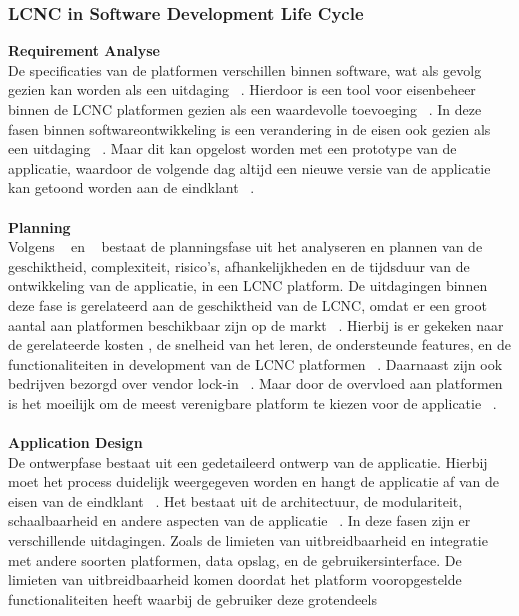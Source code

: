 \subsubsection*{LCNC in Software Development Life Cycle}
\label{subsec:lcnc-binnen-agile}
\textbf{Requirement Analyse}
\\
De specificaties van de platformen verschillen binnen software, wat als gevolg gezien kan worden als een uitdaging ~\autocite{Rokis_2022}. 
Hierdoor is een tool voor eisenbeheer binnen de LCNC platformen gezien als een waardevolle toevoeging ~\autocite{Rokis_2022}. 
In deze fasen binnen softwareontwikkeling is een verandering in de eisen ook gezien als een uitdaging ~\autocite{Rokis_2022}. 
Maar dit kan opgelost worden met een prototype van de applicatie, 
waardoor de volgende dag altijd een nieuwe versie van de applicatie kan getoond worden aan de eindklant ~\autocite{Rokis_2022}.
\\
\\
\textbf{Planning}
\\
Volgens ~\textcite{Rokis_2022} en ~\textcite{Ghumatkar_2023}  bestaat de planningsfase uit het analyseren en plannen van de geschiktheid, complexiteit, risico's, afhankelijkheden en 
de tijdsduur van de ontwikkeling van de applicatie, in een LCNC platform. De uitdagingen binnen deze fase is gerelateerd aan de geschiktheid van de LCNC, 
omdat er een groot aantal aan platformen beschikbaar zijn op de markt ~\autocite{Rokis_2022}. Hierbij is er gekeken naar de gerelateerde kosten , de 
snelheid van het leren, de ondersteunde features, en de functionaliteiten in development van de LCNC platformen ~\autocite{Rokis_2022}. 
Daarnaast zijn ook bedrijven bezorgd over vendor lock-in ~\autocite{Rokis_2022}. Maar door de overvloed aan platformen is het moeilijk om 
de meest verenigbare platform te kiezen voor de applicatie ~\autocite{Rokis_2022}.
\\
\\
\textbf{Application Design}
\\
De ontwerpfase bestaat uit een gedetaileerd ontwerp van de applicatie. Hierbij moet het process duidelijk weergegeven worden en hangt de applicatie af van de eisen van de eindklant ~\autocite{Ghumatkar_2023}. 
Het bestaat uit de architectuur, de modulariteit, schaalbaarheid en andere aspecten van de applicatie ~\autocite{Rokis_2022}. 
In deze fasen zijn er verschillende uitdagingen. Zoals de limieten van uitbreidbaarheid en integratie met andere soorten platformen, data opslag, en de gebruikersinterface. De limieten van uitbreidbaarheid komen doordat het platform vooropgestelde functionaliteiten heeft waarbij de gebruiker deze grotendeels 
